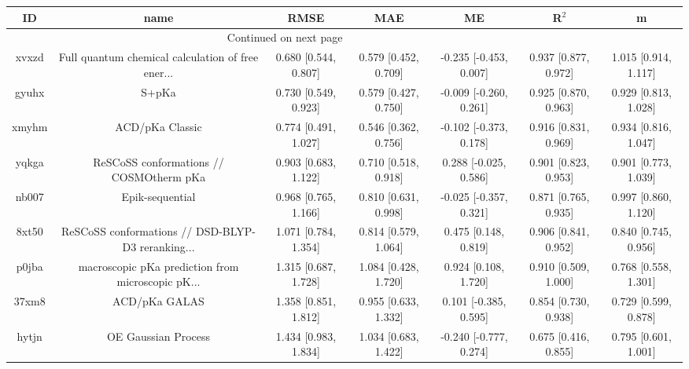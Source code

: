 \documentclass{article}
\begin{document}
\begin{center}
\begin{longtable}{|ccccccc|}
\toprule
    ID &                                               name &                  RMSE &                   MAE &                       ME &                 R$^2$ &                      m \\
\midrule
\endhead
\midrule
\multicolumn{3}{r}{{Continued on next page}} \\
\midrule
\endfoot

\bottomrule
\endlastfoot
 xvxzd &  Full quantum chemical calculation of free ener... &  0.680 [0.544, 0.807] &  0.579 [0.452, 0.709] &   -0.235 [-0.453, 0.007] &  0.937 [0.877, 0.972] &   1.015 [0.914, 1.117] \\
 gyuhx &                                              S+pKa &  0.730 [0.549, 0.923] &  0.579 [0.427, 0.750] &   -0.009 [-0.260, 0.261] &  0.925 [0.870, 0.963] &   0.929 [0.813, 1.028] \\
 xmyhm &                                    ACD/pKa Classic &  0.774 [0.491, 1.027] &  0.546 [0.362, 0.756] &   -0.102 [-0.373, 0.178] &  0.916 [0.831, 0.969] &   0.934 [0.816, 1.047] \\
 yqkga &            ReSCoSS conformations // COSMOtherm pKa &  0.903 [0.683, 1.122] &  0.710 [0.518, 0.918] &    0.288 [-0.025, 0.586] &  0.901 [0.823, 0.953] &   0.901 [0.773, 1.039] \\
 nb007 &                                    Epik-sequential &  0.968 [0.765, 1.166] &  0.810 [0.631, 0.998] &   -0.025 [-0.357, 0.321] &  0.871 [0.765, 0.935] &   0.997 [0.860, 1.120] \\
 8xt50 &  ReSCoSS conformations // DSD-BLYP-D3 reranking... &  1.071 [0.784, 1.354] &  0.814 [0.579, 1.064] &     0.475 [0.148, 0.819] &  0.906 [0.841, 0.952] &   0.840 [0.745, 0.956] \\
 p0jba &  macroscopic pKa prediction from microscopic pK... &  1.315 [0.687, 1.728] &  1.084 [0.428, 1.720] &     0.924 [0.108, 1.720] &  0.910 [0.509, 1.000] &   0.768 [0.558, 1.301] \\
 37xm8 &                                      ACD/pKa GALAS &  1.358 [0.851, 1.812] &  0.955 [0.633, 1.332] &    0.101 [-0.385, 0.595] &  0.854 [0.730, 0.938] &   0.729 [0.599, 0.878] \\
 hytjn &                                OE Gaussian Process &  1.434 [0.983, 1.834] &  1.034 [0.683, 1.422] &   -0.240 [-0.777, 0.274] &  0.675 [0.416, 0.855] &   0.795 [0.601, 1.001] \\

\end{longtable}
\end{center}
\end{document}

